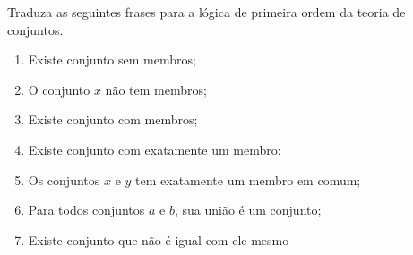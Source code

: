\begin{exercise}

Traduza as seguintes frases para a lógica de primeira ordem da teoria de conjuntos.
\begin{enumerate}
  \item Existe conjunto sem membros;
  \item O conjunto $x$ não tem membros;
  \item Existe conjunto com membros;
  \item Existe conjunto com exatamente um membro;
  \item Os conjuntos $x$ e $y$ tem exatamente um membro em comum;
  \item Para todos conjuntos $a$ e $b$, sua união é um conjunto;
  \item Existe conjunto que não é igual com ele mesmo
\end{enumerate}
\end{exercise}
